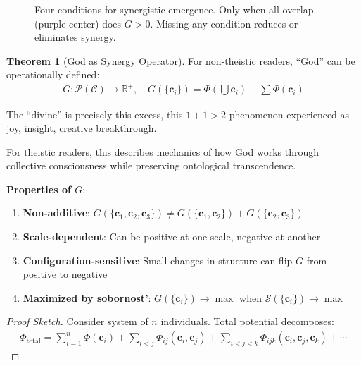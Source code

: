 \documentclass[11pt,a4paper]{article}
\theoremstyle{definition}
\newtheorem{theorem}{Theorem}[section]
\theoremstyle{remark}
\newcommand{\RR}{\mathbb{R}}
\newcommand{\CC}{\mathcal{C}}
\newcommand{\cc}{\mathbf{c}}
\begin{document}
\begin{small}
\begin{enumerate}
\begin{figure}[H]
\caption{Four conditions for synergistic emergence. Only when all overlap (purple center) does \(G > 0\). Missing any condition reduces or eliminates synergy.}
\label{fig:emergence_conditions}
\end{figure}

\begin{theorem}[God as Synergy Operator]
For non-theistic readers, ``God'' can be operationally defined:
\begin{align}
G: \mathcal{P}(\CC) \to \RR^+, \quad G(\{\cc_i\}) = \Phi\left(\bigcup \cc_i\right) - \sum \Phi(\cc_i)
\end{align}

The ``divine'' is precisely this excess, this \(1+1 > 2\) phenomenon experienced as joy, insight, creative breakthrough.

For theistic readers, this describes mechanics of how God works through collective consciousness while preserving ontological transcendence.

\textbf{Properties of \(G\)}:
\begin{enumerate}
    \item \textbf{Non-additive}: \(G(\{\cc_1, \cc_2, \cc_3\}) \neq G(\{\cc_1, \cc_2\}) + G(\{\cc_2, \cc_3\})\)
    \item \textbf{Scale-dependent}: Can be positive at one scale, negative at another
    \item \textbf{Configuration-sensitive}: Small changes in structure can flip \(G\) from positive to negative
    \item \textbf{Maximized by sobornost'}: \(G(\{\cc_i\}) \to \max\) when \(\mathcal{S}(\{\cc_i\}) \to \max\)
\end{enumerate}
\end{theorem}

\begin{proof}[Proof Sketch]
Consider system of \(n\) individuals. Total potential decomposes:
\begin{align}
\Phi_{\text{total}} = \sum_{i=1}^n \Phi(\cc_i) + \sum_{i<j} \Phi_{ij}(\cc_i, \cc_j) + \sum_{i<j<k} \Phi_{ijk}(\cc_i, \cc_j, \cc_k) + \cdots
\end{align}


\end{proof}
\end{enumerate}
\end{small}
\end{document}
